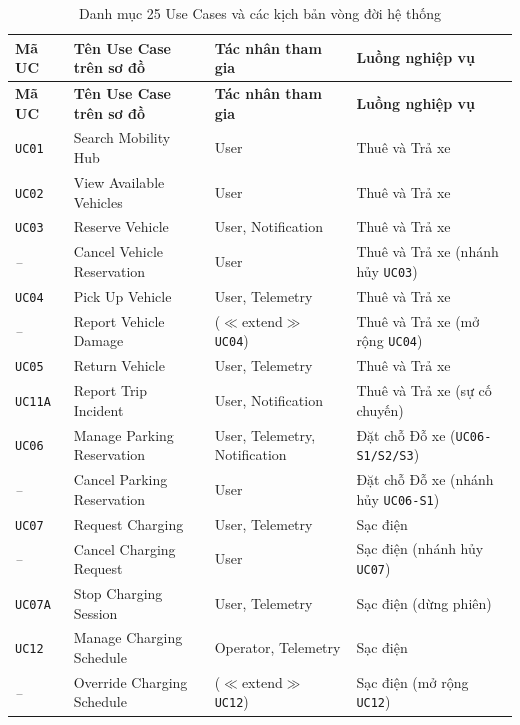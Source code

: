 \begin{longtable}{>{\centering\arraybackslash}p{1.6cm} >{\raggedright\arraybackslash}p{4.4cm} >{\raggedright\arraybackslash}p{3.0cm} >{\raggedright\arraybackslash\small}p{4.5cm}}
\caption{Danh mục 25 Use Cases và các kịch bản vòng đời hệ thống} \label{tab:uc-catalog} \\
\toprule
\textbf{Mã UC} & \textbf{Tên Use Case trên sơ đồ} & \textbf{Tác nhân tham gia} & \textbf{Luồng nghiệp vụ} \\
\midrule
\endfirsthead
\toprule
\textbf{Mã UC} & \textbf{Tên Use Case trên sơ đồ} & \textbf{Tác nhân tham gia} & \textbf{Luồng nghiệp vụ} \\
\midrule
\endhead
\bottomrule
\endfoot
\texttt{UC01} & Search Mobility Hub & User & Thuê và Trả xe \\
\texttt{UC02} & View Available Vehicles & User & Thuê và Trả xe \\
\texttt{UC03} & Reserve Vehicle & User, Notification & Thuê và Trả xe \\
\textit{--} & Cancel Vehicle Reservation & User & Thuê và Trả xe (nhánh hủy \texttt{UC03}) \\
\texttt{UC04} & Pick Up Vehicle & User, Telemetry & Thuê và Trả xe \\
\textit{--} & Report Vehicle Damage & ($\ll$extend$\gg$ \texttt{UC04}) & Thuê và Trả xe (mở rộng \texttt{UC04}) \\
\texttt{UC05} & Return Vehicle & User, Telemetry & Thuê và Trả xe \\
\texttt{UC11A} & Report Trip Incident & User, Notification & Thuê và Trả xe (sự cố chuyến) \\
\midrule
\texttt{UC06} & Manage Parking Reservation & User, Telemetry, Notification & Đặt chỗ Đỗ xe (\texttt{UC06-S1/S2/S3}) \\
\textit{--} & Cancel Parking Reservation & User & Đặt chỗ Đỗ xe (nhánh hủy \texttt{UC06-S1}) \\
\midrule
\texttt{UC07} & Request Charging & User, Telemetry & Sạc điện \\
\textit{--} & Cancel Charging Request & User & Sạc điện (nhánh hủy \texttt{UC07}) \\
\texttt{UC07A} & Stop Charging Session & User, Telemetry & Sạc điện (dừng phiên) \\
\texttt{UC12} & Manage Charging Schedule & Operator, Telemetry & Sạc điện \\
\textit{--} & Override Charging Schedule & ($\ll$extend$\gg$ \texttt{UC12}) & Sạc điện (mở rộng \texttt{UC12}) \\

\end{longtable}
